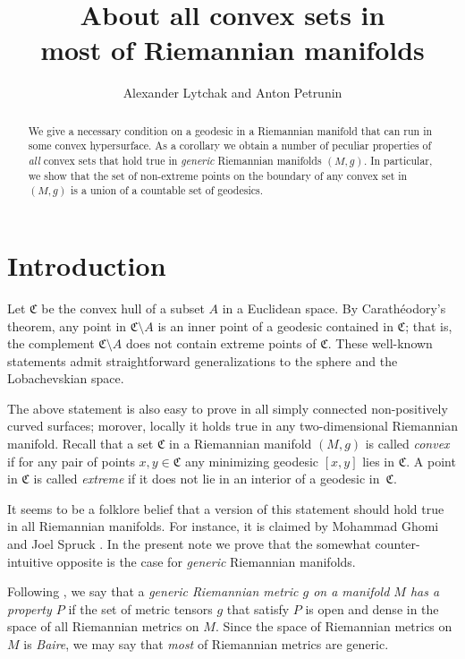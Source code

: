 \documentclass[a4paper,10pt]{article}
\begin{document}
 
\title{About all convex sets in\\
most of Riemannian manifolds}
\author{Alexander Lytchak and Anton Petrunin}
\date{}
\maketitle

\begin{abstract}
We give a necessary condition on a geodesic in a Riemannian manifold that can run in some convex hypersurface.
As a corollary we obtain a number of peculiar properties of \emph{all} convex sets that hold true in \emph{generic} Riemannian manifolds $(M,g)$.
In particular, we show that the set of non-extreme points on the boundary of any convex set in $(M,g)$
is a union of a countable set of geodesics.
\end{abstract}

\section{Introduction}
Let $\mathfrak{C}$ be the convex hull of a subset $A$ in a Euclidean space.
By Carathéodory's theorem, any point in $\mathfrak{C}\setminus A$ is an inner point of a geodesic contained in $\mathfrak{C}$;
that is, the complement $\mathfrak{C} \setminus A$ does not contain extreme points of $\mathfrak{C}$.  
These well-known statements admit straightforward generalizations to the sphere and the Lobachevskian space.
 
The above statement is also easy to prove in all simply connected non-positively curved surfaces;
morover, locally it holds true in any two-dimensional Riemannian manifold.
Recall that a set $\mathfrak{C}$ in a Riemannian manifold $(M,g)$ is called \emph{convex} if for any pair of points $x,y\in \mathfrak{C}$ any minimizing geodesic $[x,y]$ lies in $\mathfrak{C}$.
A point in $\mathfrak{C}$ is called \emph{extreme} if it does not lie in an interior of a geodesic in~$\mathfrak{C}$.

It seems to be a folklore belief that a version of this statement should hold true in all Riemannian manifolds. 
For instance, it is claimed by Mohammad Ghomi and Joel Spruck \cite[Lemma 9.1]{Ghomi}.
In the present note we prove that the somewhat counter-intuitive opposite is the case for \emph{generic} Riemannian manifolds. 

Following \cite{eliashberg-mishachev}, we say that a \emph{generic Riemannian metric $g$ on a manifold $M$ 
has a property $P$} if the set of metric tensors $g$ that satisfy $P$ is open and dense in the space of all Riemannian metrics on $M$.
Since the space of Riemannian metrics on $M$ is \emph{Baire}, we may say that \emph{most} of Riemannian metrics are generic.
\end{document}
